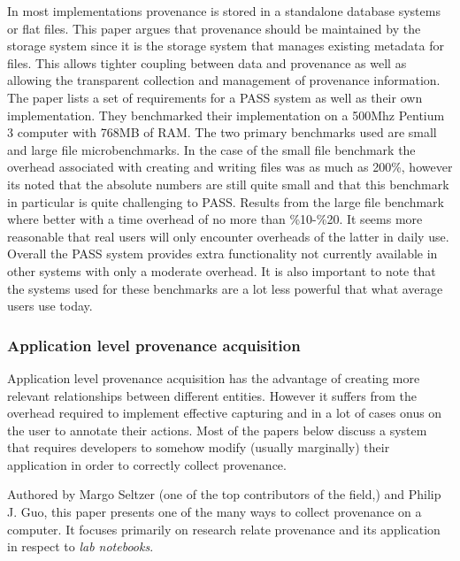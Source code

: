 In most implementations provenance is stored in a standalone database systems or flat files. This paper argues that provenance should be maintained by the storage system since it is the storage system that manages existing metadata for files. This allows tighter coupling between data and provenance as well as allowing the transparent collection and management of provenance information. The paper lists a set of requirements for a PASS system as well as their own implementation. They benchmarked their implementation on a 500Mhz Pentium 3 computer with 768MB of RAM. The two primary benchmarks used are small and large file microbenchmarks. In the case of the small file benchmark the overhead associated with creating and writing files was as much as 200\%, however its noted that the absolute numbers are still quite small and that this benchmark in particular is quite challenging to PASS. Results from the large file benchmark where better with a time overhead of no more than \%10-\%20.  It seems more reasonable that real users will only encounter overheads of the latter in daily use. Overall the PASS system provides extra functionality not currently available in other systems with only a moderate overhead. It is also important to note that the systems used for these benchmarks are a lot less powerful that what average users use today.

\subsubsection{Application level provenance acquisition}
\label{sub:application_level_provenance_acquisition}

Application level provenance acquisition has the advantage of creating more relevant relationships between different entities. However it suffers from the overhead required to implement effective capturing and in a lot of cases onus on the user to annotate their actions. Most of the papers below discuss a system that requires developers to somehow modify (usually marginally) their application in order to correctly collect provenance.

Authored by Margo Seltzer (one of the top contributors of the field\cite{Macko2012,Seltzer2011,Borkin2013,Muniswamy-Reddy2010,Braun2008},) and Philip J. Guo, this paper presents one of the many ways to collect provenance on a computer. It focuses primarily on research relate provenance and its application in respect to \textit{lab notebooks}.

